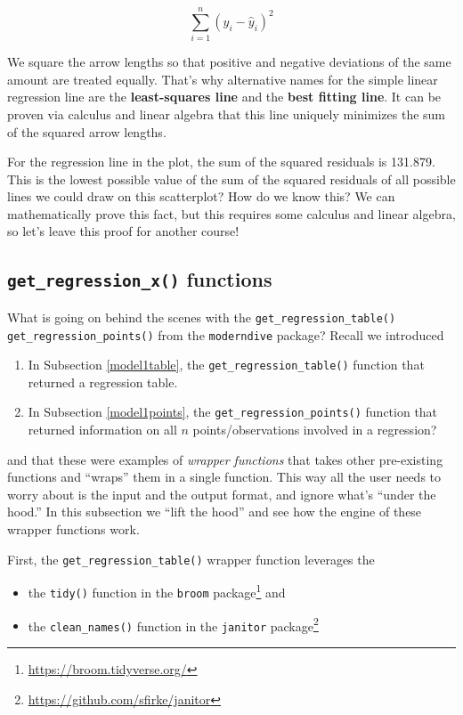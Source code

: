 \documentclass[12pt, krantz2,]{krantz}
\providecommand{\tightlist}{%
  \setlength{\itemsep}{0pt}\setlength{\parskip}{0pt}}
\renewcommand{\href}[2]{#2\footnote{\url{#1}}}
\begin{document}
\[
\sum_{i=1}^{n}(y_i - \widehat{y}_i)^2
\]

We square the arrow lengths so that positive and negative deviations of the same amount are treated equally. That's why alternative names for the simple linear regression line are the \textbf{least-squares line} and the \textbf{best fitting line}. It can be proven via calculus and linear algebra that this line uniquely minimizes the sum of the squared arrow lengths.

For the regression line in the plot, the sum of the squared residuals is 131.879. This is the lowest possible value of the sum of the squared residuals of all possible lines we could draw on this scatterplot? How do we know this? We can mathematically prove this fact, but this requires some calculus and linear algebra, so let's leave this proof for another course!

\hypertarget{underthehood}{%
\subsection{\texorpdfstring{\texttt{get\_regression\_x()} functions}{get\_regression\_x() functions}}\label{underthehood}}

What is going on behind the scenes with the \texttt{get\_regression\_table()} \texttt{get\_regression\_points()} from the \texttt{moderndive} package? Recall we introduced

\begin{enumerate}
\def\labelenumi{\arabic{enumi}.}
\tightlist
\item
  In Subsection \ref{model1table}, the \texttt{get\_regression\_table()} function that returned a regression table.
\item
  In Subsection \ref{model1points}, the \texttt{get\_regression\_points()} function that returned information on all \(n\) points/observations involved in a regression?
\end{enumerate}

and that these were examples of \emph{wrapper functions} that takes other pre-existing functions and ``wraps'' them in a single function. This way all the user needs to worry about is the input and the output format, and ignore what's ``under the hood.'' In this subsection we ``lift the hood'' and see how the engine of these wrapper functions work.

First, the \texttt{get\_regression\_table()} wrapper function leverages the

\begin{itemize}
\tightlist
\item
  the \texttt{tidy()} function in the \href{https://broom.tidyverse.org/}{\texttt{broom} package} and
\item
  the \texttt{clean\_names()} function in the \href{https://github.com/sfirke/janitor}{\texttt{janitor} package}
\end{itemize}
\end{document}
